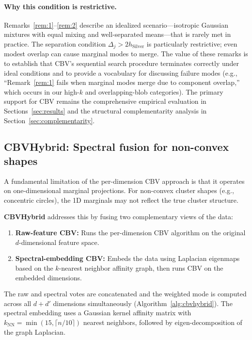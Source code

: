 \documentclass[journal]{IEEEtran}
\begin{document}
\paragraph{Why this condition is restrictive.}
Remarks~\ref{rem:1}--\ref{rem:2} describe an idealized scenario---isotropic Gaussian mixtures with equal mixing and well-separated means---that is rarely met in practice. The separation condition $\Delta_j > 2 h_{\mathrm{Silver}}$ is particularly restrictive; even modest overlap can cause marginal modes to merge. The value of these remarks is to establish that CBV's sequential search procedure terminates correctly under ideal conditions and to provide a vocabulary for discussing failure modes (e.g., ``Remark~\ref{rem:1} fails when marginal modes merge due to component overlap,'' which occurs in our high-$k$ and overlapping-blob categories). The primary support for CBV remains the comprehensive empirical evaluation in Sections~\ref{sec:results} and the structural complementarity analysis in Section~\ref{sec:complementarity}.

\subsection{CBVHybrid: Spectral fusion for non-convex shapes}
\label{sec:cbvhybrid}

A fundamental limitation of the per-dimension CBV approach is that it operates on one-dimensional marginal projections. For non-convex cluster shapes (e.g., concentric circles), the 1D marginals may not reflect the true cluster structure.

\textbf{CBVHybrid} addresses this by fusing two complementary views of the data:

\begin{enumerate}
    \item \textbf{Raw-feature CBV:} Runs the per-dimension CBV algorithm on the original $d$-dimensional feature space.
    \item \textbf{Spectral-embedding CBV:} Embeds the data using Laplacian eigenmaps based on the $k$-nearest neighbor affinity graph, then runs CBV on the embedded dimensions.
\end{enumerate}

The raw and spectral votes are concatenated and the weighted mode is computed across all $d + d'$ dimensions simultaneously (Algorithm~\ref{alg:cbvhybrid}). The spectral embedding uses a Gaussian kernel affinity matrix with $k_{\mathrm{NN}} = \min(15, \lceil n/10 \rceil)$ nearest neighbors, followed by eigen-decomposition of the graph Laplacian.
\end{document}
